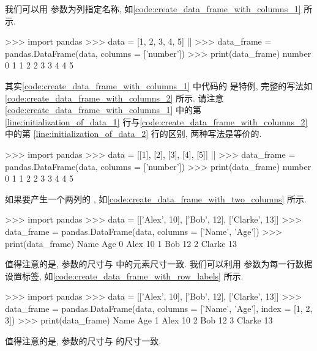 我们可以用  参数为列指定名称, 如\cref{code:create_data_frame_with_columns_1} 所示.%
%
\begin{codebox}[
  label = code:create_data_frame_with_columns_1,
  caption = 用 \inlinetext{columns} 参数为列指定名称
]
>>> import pandas
>>> data = [1, 2, 3, 4, 5] |\label{line:initialization_of_data_1}|
>>> data_frame = pandas.DataFrame(data, columns = ['number'])
>>> print(data_frame)
   number
0       1
1       2
2       3
3       4
4       5
\end{codebox}%
%
其实\cref{code:create_data_frame_with_columns_1} 中代码的  是特例, 完整的写法如\cref{code:create_data_frame_with_columns_2} 所示. 请注意\cref{code:create_data_frame_with_columns_1} 中的第 \ref{line:initialization_of_data_1} 行与\cref{code:create_data_frame_with_columns_2} 中的第 \ref{line:initialization_of_data_2} 行的区别, 两种写法是等价的.%
%
\begin{codebox}[
  label = code:create_data_frame_with_columns_2,
  caption = 用 \inlinetext{columns} 参数为列指定名称,
]
>>> import pandas
>>> data = [[1], [2], [3], [4], [5]] |\label{line:initialization_of_data_2}|
>>> data_frame = pandas.DataFrame(data, columns = ['number'])
>>> print(data_frame)
   number
0       1
1       2
2       3
3       4
4       5
\end{codebox}

如果要产生一个两列的 , 如\cref{code:create_data_frame_with_two_columns} 所示.%
%
\begin{codebox}[
  label = code:create_data_frame_with_two_columns,
  caption = 产生两列的 \inlinetext{DataFrame},
]
>>> import pandas
>>> data = [['Alex', 10], ['Bob', 12], ['Clarke', 13]]
>>> data_frame = pandas.DataFrame(data, columns = ['Name', 'Age'])
>>> print(data_frame)
     Name  Age
0    Alex   10
1     Bob   12
2  Clarke   13
\end{codebox}%
%
值得注意的是,  参数的尺寸与  中的元素尺寸一致. 我们可以利用  参数为每一行数据设置标签, 如\cref{code:create_data_frame_with_row_labels} 所示.%
%
\begin{codebox}[
  label = code:create_data_frame_with_row_labels,
  caption = 为 \inlinetext{DataFrame} 设置行标签,
]
>>> import pandas
>>> data = [['Alex', 10], ['Bob', 12], ['Clarke', 13]]
>>> data_frame = pandas.DataFrame(data, columns = ['Name', 'Age'], index = [1, 2, 3])
>>> print(data_frame)
     Name  Age
1    Alex   10
2     Bob   12
3  Clarke   13
\end{codebox}%
%
值得注意的是,  参数的尺寸与  的尺寸一致.

